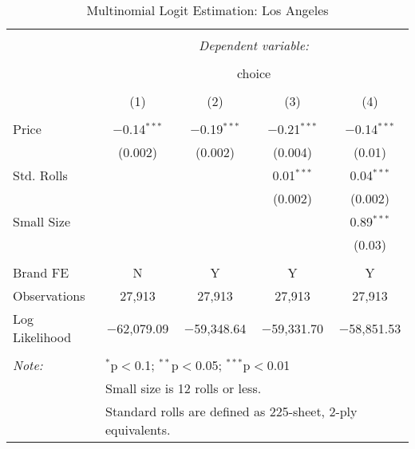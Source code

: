 
\begin{table}[!htbp] \centering 
  \caption{Multinomial Logit Estimation: Los Angeles} 
  \label{tab:mnlLos AngelesBaseline} 
\begin{tabular}{@{\extracolsep{5pt}}lcccc} 
\\[-1.8ex]\hline 
\hline \\[-1.8ex] 
 & \multicolumn{4}{c}{\textit{Dependent variable:}} \\ 
\cline{2-5} 
\\[-1.8ex] & \multicolumn{4}{c}{choice} \\ 
\\[-1.8ex] & (1) & (2) & (3) & (4)\\ 
\hline \\[-1.8ex] 
 Price & $-$0.14$^{***}$ & $-$0.19$^{***}$ & $-$0.21$^{***}$ & $-$0.14$^{***}$ \\ 
  & (0.002) & (0.002) & (0.004) & (0.01) \\ 
  Std. Rolls &  &  & 0.01$^{***}$ & 0.04$^{***}$ \\ 
  &  &  & (0.002) & (0.002) \\ 
  Small Size &  &  &  & 0.89$^{***}$ \\ 
  &  &  &  & (0.03) \\ 
 \hline \\[-1.8ex] 
Brand FE & N & Y & Y & Y \\ 
Observations & 27,913 & 27,913 & 27,913 & 27,913 \\ 
Log Likelihood & $-$62,079.09 & $-$59,348.64 & $-$59,331.70 & $-$58,851.53 \\ 
\hline 
\hline \\[-1.8ex] 
\textit{Note:}  & \multicolumn{4}{l}{$^{*}$p$<$0.1; $^{**}$p$<$0.05; $^{***}$p$<$0.01} \\ 
 & \multicolumn{4}{l}{Small size is 12 rolls or less.} \\ 
 & \multicolumn{4}{l}{Standard rolls are defined as 225-sheet, 2-ply equivalents.} \\ 
\end{tabular} 
\end{table} 
